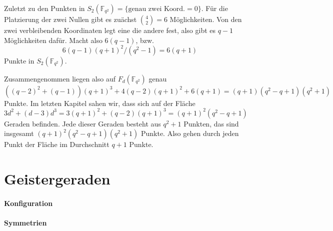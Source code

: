Zuletzt zu den Punkten in $S_2(\mathbb F_{q^2}) = \{\text{genau zwei Koord.}= 0\}$. Für die Platzierung der zwei Nullen gibt es zuächst $\binom 4 2 = 6$ Möglichkeiten. Von den zwei verbleibenden Koordinaten legt eine die andere fest, also gibt es $q-1$ Möglichkeiten dafür. Macht also $6(q-1)$, bzw.
\begin{equation}
6(q-1)(q+1)^2/(q^2-1) = 6(q+1)
\end{equation}
Punkte in $S_2(\mathbb F_{q^2})$.

Zusammengenommen liegen also auf $F_d(\mathbb F_{q^2})$ genau
\begin{equation}
((q-2)^2+(q-1))(q+1)^3 + 4(q-2)(q+1)^2 + 6(q+1) = (q+1)(q^2-q+1)(q^2+1)
\end{equation}
Punkte. Im letzten Kapitel sahen wir, dass sich auf der Fläche $3d^2 + (d-3)d^3 = 3(q+1)^2 + (q-2)(q+1)^3 = (q+1)^2(q^2-q+1)$ Geraden befinden. Jede dieser Geraden besteht aus $q^2+1$ Punkten, das sind insgesamt $(q+1)^2(q^2-q+1)(q^2+1)$ Punkte. Also gehen durch jeden Punkt der Fläche im Durchschnitt $q+1$ Punkte.

\section{Geistergeraden}
\paragraph{Konfiguration}
\paragraph{Symmetrien}
